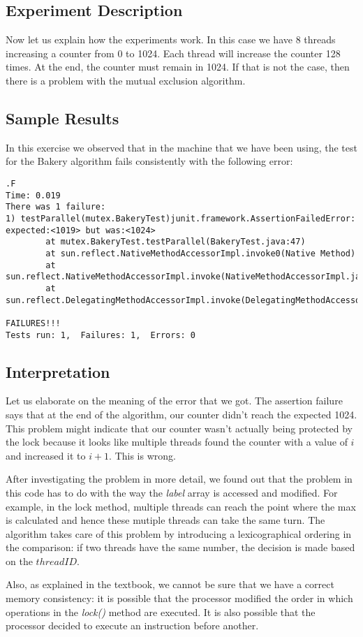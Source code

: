 \subsection{Experiment Description}
\par
Now let us explain how the experiments work. In this case we have 8 threads
increasing a counter from 0 to 1024. Each thread will increase the counter 128
times. At the end, the counter must remain in 1024. If that is not the case,
then there is a problem with the mutual exclusion algorithm.
\par
\subsection{Sample Results}
\par
In this exercise we observed that in the machine that we have been using, the
test for the Bakery algorithm fails consistently with the following error:
\par
\begin{verbatim}
.F
Time: 0.019
There was 1 failure:
1) testParallel(mutex.BakeryTest)junit.framework.AssertionFailedError:
expected:<1019> but was:<1024>
        at mutex.BakeryTest.testParallel(BakeryTest.java:47)
        at sun.reflect.NativeMethodAccessorImpl.invoke0(Native Method)
        at
sun.reflect.NativeMethodAccessorImpl.invoke(NativeMethodAccessorImpl.java:57)
        at
sun.reflect.DelegatingMethodAccessorImpl.invoke(DelegatingMethodAccessorImpl.java:43)

FAILURES!!!
Tests run: 1,  Failures: 1,  Errors: 0
\end{verbatim}
\par
\subsection{Interpretation}
\par
Let us elaborate on the meaning of the error that we got. The assertion failure
says that at the end of the algorithm, our counter didn't reach the expected
1024. This problem might indicate that our counter wasn't actually being
protected by the lock because it looks like multiple threads found the counter
with a value of $i$ and increased it to $i+1$. This is wrong.
\par
After investigating the problem in more detail, we found out that the problem in
this code has to do with the way the \textit{label} array is accessed and
modified. For example, in the lock method, multiple threads can reach the point
where the max is calculated and hence these mutiple threads can take the same
turn. The algorithm takes care of this problem by introducing a lexicographical
ordering in the comparison: if two threads have the same number, the decision is
made based on the $threadID$.
\par
Also, as explained in the textbook, we cannot be sure that we have a correct
memory consistency: it is possible that the processor modified the order in
which operations in the \textit{lock()} method are executed. It is also possible
that the processor decided to execute an instruction before another.
\par
